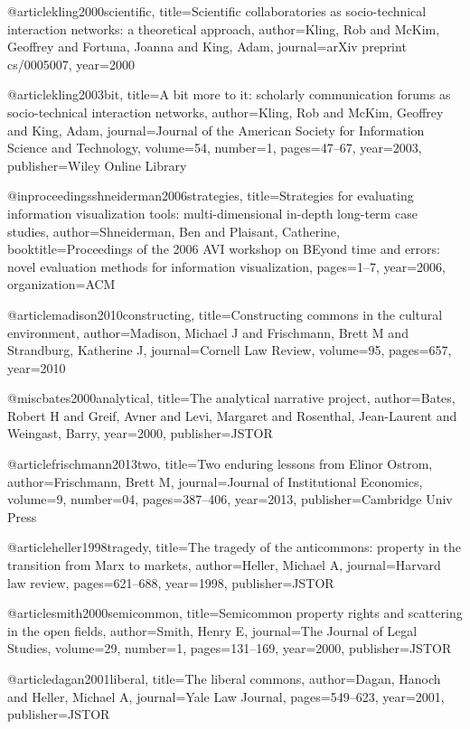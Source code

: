 @article{kling2000scientific,
  title={Scientific collaboratories as socio-technical interaction networks: a theoretical approach},
  author={Kling, Rob and McKim, Geoffrey and Fortuna, Joanna and King, Adam},
  journal={arXiv preprint cs/0005007},
  year={2000}
}

@article{kling2003bit,
  title={A bit more to it: scholarly communication forums as socio-technical interaction networks},
  author={Kling, Rob and McKim, Geoffrey and King, Adam},
  journal={Journal of the American Society for Information Science and Technology},
  volume={54},
  number={1},
  pages={47--67},
  year={2003},
  publisher={Wiley Online Library}
}


@inproceedings{shneiderman2006strategies,
  title={Strategies for evaluating information visualization tools: multi-dimensional in-depth long-term case studies},
  author={Shneiderman, Ben and Plaisant, Catherine},
  booktitle={Proceedings of the 2006 AVI workshop on BEyond time and errors: novel evaluation methods for information visualization},
  pages={1--7},
  year={2006},
  organization={ACM}
}


@article{madison2010constructing,
  title={Constructing commons in the cultural environment},
  author={Madison, Michael J and Frischmann, Brett M and Strandburg, Katherine J},
  journal={Cornell Law Review},
  volume={95},
  pages={657},
  year={2010}
}

@misc{bates2000analytical,
  title={The analytical narrative project},
  author={Bates, Robert H and Greif, Avner and Levi, Margaret and Rosenthal, Jean-Laurent and Weingast, Barry},
  year={2000},
  publisher={JSTOR}
}


@article{frischmann2013two,
  title={Two enduring lessons from Elinor Ostrom},
  author={Frischmann, Brett M},
  journal={Journal of Institutional Economics},
  volume={9},
  number={04},
  pages={387--406},
  year={2013},
  publisher={Cambridge Univ Press}
}


@article{heller1998tragedy,
  title={The tragedy of the anticommons: property in the transition from Marx to markets},
  author={Heller, Michael A},
  journal={Harvard law review},
  pages={621--688},
  year={1998},
  publisher={JSTOR}
}

@article{smith2000semicommon,
  title={Semicommon property rights and scattering in the open fields},
  author={Smith, Henry E},
  journal={The Journal of Legal Studies},
  volume={29},
  number={1},
  pages={131--169},
  year={2000},
  publisher={JSTOR}
}

@article{dagan2001liberal,
  title={The liberal commons},
  author={Dagan, Hanoch and Heller, Michael A},
  journal={Yale Law Journal},
  pages={549--623},
  year={2001},
  publisher={JSTOR}
}


